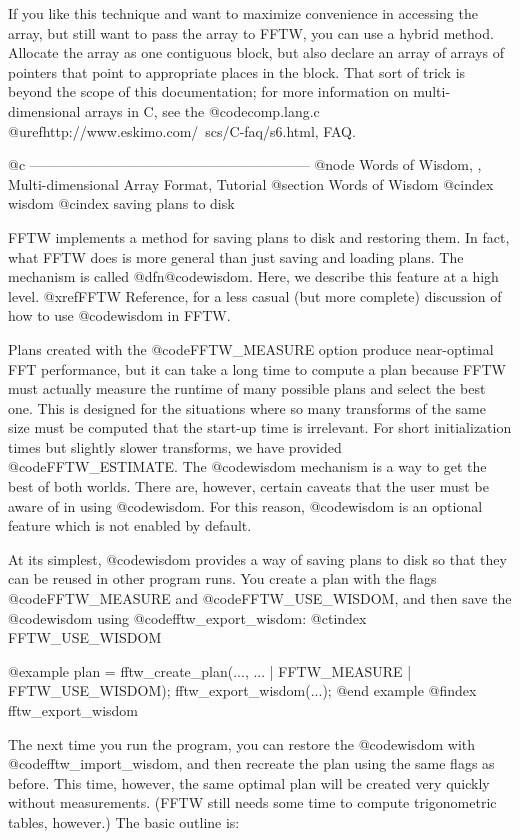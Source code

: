 If you like this technique and want to maximize convenience in accessing
the array, but still want to pass the array to FFTW, you can use a
hybrid method.  Allocate the array as one contiguous block, but also
declare an array of arrays of pointers that point to appropriate places
in the block.  That sort of trick is beyond the scope of this
documentation; for more information on multi-dimensional arrays in C,
see the @code{comp.lang.c}
@uref{http://www.eskimo.com/~scs/C-faq/s6.html, FAQ}.

@c ------------------------------------------------------------
@node Words of Wisdom,  , Multi-dimensional Array Format, Tutorial
@section Words of Wisdom
@cindex wisdom
@cindex saving plans to disk

FFTW implements a method for saving plans to disk and restoring them.
In fact, what FFTW does is more general than just saving and loading
plans.  The mechanism is called @dfn{@code{wisdom}}.  Here, we describe
this feature at a high level. @xref{FFTW Reference}, for a less casual
(but more complete) discussion of how to use @code{wisdom} in FFTW.

Plans created with the @code{FFTW_MEASURE} option produce near-optimal
FFT performance, but it can take a long time to compute a plan because
FFTW must actually measure the runtime of many possible plans and select
the best one.  This is designed for the situations where so many
transforms of the same size must be computed that the start-up time is
irrelevant.  For short initialization times but slightly slower
transforms, we have provided @code{FFTW_ESTIMATE}.  The @code{wisdom}
mechanism is a way to get the best of both worlds.  There are, however,
certain caveats that the user must be aware of in using @code{wisdom}.
For this reason, @code{wisdom} is an optional feature which is not
enabled by default.

At its simplest, @code{wisdom} provides a way of saving plans to disk so
that they can be reused in other program runs.  You create a plan with
the flags @code{FFTW_MEASURE} and @code{FFTW_USE_WISDOM}, and then save
the @code{wisdom} using @code{fftw_export_wisdom}:
@ctindex FFTW_USE_WISDOM

@example
     plan = fftw_create_plan(..., ... | FFTW_MEASURE | FFTW_USE_WISDOM);
     fftw_export_wisdom(...);
@end example
@findex fftw_export_wisdom

The next time you run the program, you can restore the @code{wisdom}
with @code{fftw_import_wisdom}, and then recreate the plan using the
same flags as before.  This time, however, the same optimal plan will be
created very quickly without measurements. (FFTW still needs some time
to compute trigonometric tables, however.)  The basic outline is:

